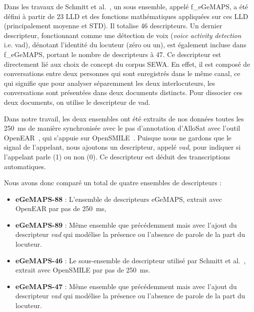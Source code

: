 Dans les travaux de Schmitt et al.~\cite{Schmitt2019}, un sous ensemble, appelé f\_eGeMAPS, a été défini à partir de 23 LLD et des fonctions mathématiques appliquées sur ces LLD (principalement moyenne et STD). Il totalise 46 descripteurs. Un dernier descripteur, fonctionnant comme une détection de voix (\textit{voice activity detection} i.e. vad), dénotant l'identité du locuteur (zéro ou un), est également incluse dans f\_eGeMAPS, portant le nombre de descripteurs à 47. Ce descripteur est directement lié aux choix de concept du corpus SEWA. En effet, il est composé de conversations entre deux personnes qui sont enregistrés dans le même canal, ce qui signifie que pour analyser séparemment les deux interlocuteurs, les conversations sont présentées dans deux documents distincts. Pour dissocier ces deux documents, on utilise le descripteur de vad.

Dans notre travail, les deux ensembles ont été extraits de nos données toutes les 250~ms de manière synchronisée avec le pas d'annotation d'AlloSat avec l'outil OpenEAR~\cite{OpenEAR}, qui s'appuie sur OpenSMILE~\cite{OPENSMILE}. Puisque nous ne gardons que le signal de l'appelant, nous ajoutons un descripteur, appelé \textit{vad}, pour indiquer si l'appelant parle (1) ou non (0). Ce descripteur est déduit des transcriptions automatiques.

Nous avons donc comparé un total de quatre ensembles de descripteurs :
\begin{itemize}
    \item \textbf{eGeMAPS-88} : L'ensemble de descripteurs eGeMAPS, extrait avec OpenEAR par pas de 250~ms,
    \item \textbf{eGeMAPS-89} : Même ensemble que précédemment mais avec l'ajout du descripteur \textit{vad} qui modélise la présence ou l'absence de parole de la part du locuteur.
    \item \textbf{eGeMAPS-46} : Le sous-ensemble de descripteur utilisé par Schmitt et al.~\cite{Schmitt2019}, extrait avec OpenSMILE par pas de 250~ms.
    \item \textbf{eGeMAPS-47} : Même ensemble que précédemment mais avec l'ajout du descripteur \textit{vad} qui modélise la présence ou l'absence de parole de la part du locuteur.
\end{itemize}

